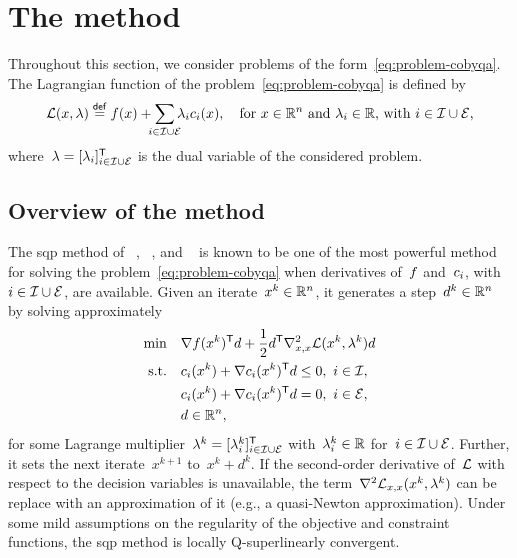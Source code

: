 \section{The  method}

Throughout this section, we consider problems of the form~\cref{eq:problem-cobyqa}.
The Lagrangian function of the problem~\cref{eq:problem-cobyqa} is defined by
\begin{equation*}
    \lag(x, \lambda) \eqdef \obj(x) + \sum_{\mathclap{i \in \iub \cup \ieq}} \lambda_i \con{i}(x), \quad \text{for~$x \in \R^n$ and~$\lambda_i \in \R$, with~$i \in \iub \cup \ieq$,}
\end{equation*}
where~$\lambda = [\lambda_i]_{i \in \mathcal{I} \cup \mathcal{E}}^{\mathsf{T}}$ is the dual variable of the considered problem.

\subsection{Overview of the method}

The \gls{sqp} method of \citeauthor{Wilson_1963}~\cite{Wilson_1963}, \citeauthor{Han_1976}~\cite{Han_1976,Han_1977}, and \citeauthor{Powell_1978a}~\cite{Powell_1978a,Powell_1978b} is known to be one of the most powerful method for solving the problem~\cref{eq:problem-cobyqa} when derivatives of~$f$ and~$c_{i}$, with~$i \in \mathcal{I} \cup \mathcal{E}$, are available.
Given an iterate~$x^k \in \mathbb{R}^n$, it generates a step~$d^k \in \mathbb{R}^n$ by solving approximately
\begin{subequations}
    \label{eq:sqp-subproblem}
    \begin{align}
        \min        & \quad \nabla \obj(x^k)^{\T} d + \frac{1}{2} d^{\T} \nabla_{x, x}^2 \lag(x^k, \lambda^k) d \label{eq:sqp-subproblem-obj}\\
        \text{s.t.} & \quad \con{i}(x^k) + \nabla \con{i}(x^k)^{\T} d \le 0, ~ i \in \iub,\\
                    & \quad \con{i}(x^k) + \nabla \con{i}(x^k)^{\T} d = 0, ~ i \in \ieq,\\
                    & \quad d \in \R^n,
    \end{align}
\end{subequations}
for some Lagrange multiplier~$\lambda^k = [\lambda_i^k]_{i \in \mathcal{I} \cup \mathcal{E}}^{\mathsf{T}}$ with~$\lambda_i^k \in \mathbb{R}$ for~$i \in \mathcal{I} \cup \mathcal{E}$.
Further, it sets the next iterate~$x^{k + 1}$ to~$x^k + d^k$.
If the second-order derivative of~$\lag$ with respect to the decision variables is unavailable, the term~$\nabla^2 \lag_{x, x}(x^k, \lambda^k)$ can be replace with an approximation of it (e.g., a quasi-Newton approximation).
Under some mild assumptions on the regularity of the objective and constraint functions, the \gls{sqp} method is locally Q-superlinearly convergent.

